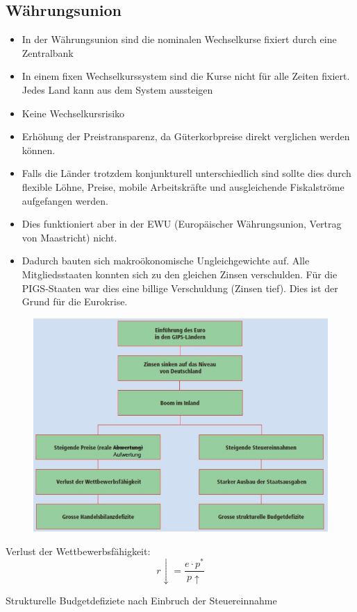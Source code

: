\subsection{Währungsunion}
\begin{itemize}
	\item In der Währungsunion sind die nominalen Wechselkurse fixiert durch eine Zentralbank
	\item In einem fixen Wechselkurssystem sind die Kurse nicht für alle Zeiten fixiert. Jedes Land kann aus dem System aussteigen
	\item Keine Wechselkursrisiko
	\item Erhöhung der Preistransparenz, da Güterkorbpreise direkt verglichen werden können.
	\item Falls die Länder trotzdem konjunkturell unterschiedlich sind sollte dies durch flexible Löhne, Preise, mobile Arbeitskräfte und ausgleichende Fiskalströme aufgefangen werden. 
	\item Dies funktioniert aber in der EWU (Europäischer Währungsunion, Vertrag von Maastricht) nicht.
	\item Dadurch bauten sich makroökonomische Ungleichgewichte auf. Alle Mitgliedsstaaten konnten sich zu den gleichen Zinsen verschulden. Für die PIGS-Staaten war dies eine billige Verschuldung (Zinsen tief). Dies ist der Grund für die Eurokrise.
\end{itemize}
\begin{figure}[h]
\centering
\includegraphics[width=0.8\linewidth]{images/eurokrise.jpg}
\end{figure}
\begin{minipage}{0.5\linewidth}
Verlust der Wettbewerbsfähigkeit:
\[ r\downarrow = \frac{e \cdot p^*}{p\uparrow} \]
\end{minipage}
\begin{minipage}{0.5\linewidth}
    Strukturelle Budgetdefiziete nach Einbruch der Steuereinnahme
\end{minipage}
\clearpage
\pagebreak